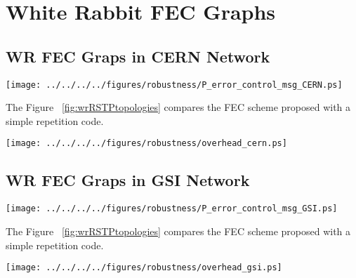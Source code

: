\section{White Rabbit FEC Graphs}
\label{app:wr_fec_graphs}


\subsection{WR FEC Graps in  CERN Network}

\begin{center}
        \texttt{[image: ../../../../figures/robustness/P\_error\_control\_msg\_CERN.ps]}
         \label{fig:wrRSTPtopologies}
\end{center}

The Figure ~\ref{fig:wrRSTPtopologies} compares the FEC scheme proposed with a simple repetition code.


\begin{center}
        \texttt{[image: ../../../../figures/robustness/overhead\_cern.ps]}
         \label{fig:wrRSTPtopologies}
\end{center}



\subsection{WR FEC Graps in  GSI Network}


\begin{center}
        \texttt{[image: ../../../../figures/robustness/P\_error\_control\_msg\_GSI.ps]}
         \label{fig:wrRSTPtopologies}
\end{center}


The Figure ~\ref{fig:wrRSTPtopologies} compares the FEC scheme proposed with a simple repetition code.

\begin{center}
        \texttt{[image: ../../../../figures/robustness/overhead\_gsi.ps]}
         \label{fig:wrRSTPtopologies}
\end{center}

\label{app:wr_fec_Graphs}









